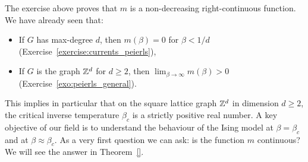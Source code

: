 \begin{remark}
    The exercise above proves that $m$ is a non-decreasing right-continuous function.
    We have already seen that:
    \begin{itemize}
        \item If $G$ has max-degree $d$,
        then $m(\beta)=0$ for $\beta<1/d$ (Exercise~\ref{exercise:currents_peierls}),
        \item If $G$ is the graph $\mathbb Z^d$ for $d\geq 2$,
        then $\lim_{\beta\to\infty}m(\beta)>0$ (Exercise~\ref{exo:peierls_general}).
    \end{itemize}
    This implies in particular that on the square lattice graph $\mathbb Z^d$ in dimension
    $d\geq 2$,
    the critical inverse temperature $\beta_c$ is a strictly positive real number.
    A key objective of our field is to understand the behaviour of the Ising model
    at $\beta=\beta_c$ and at $\beta\approx\beta_c$.
    As a very first question we can ask:
    is the function $m$ continuous?
    We will see the answer in Theorem~\ref{}.
\end{remark}


